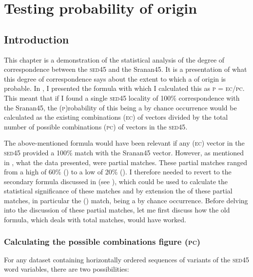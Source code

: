 \chapter{Testing probability of origin}\label{ch:4}

\section{Introduction} \label{4.1}
This chapter is a demonstration of the statistical analysis of the degree of correspondence between the \textsc{sed45} and the Sranan45. It is a presentation of what this degree of correspondence says about the extent to which a  of origin is probable. In , I presented the formula with which I calculated this  as \textsc{p} = \textsc{ec}\slash\textsc{pc}. This meant that if I found a single \textsc{sed45} locality of 100\% correspondence with the Sranan45, the (\textsc{p})robability of this being a by chance occurrence would be calculated as the existing combinations (\textsc{ec}) of vectors divided by the total number of possible combinations (\textsc{pc}) of vectors in the \textsc{sed45}.

The above-mentioned formula would have been relevant if any (\textsc{ec}) vector in the \textsc{sed45} provided a 100\% match with the Sranan45 vector. However, as mentioned in , what the data presented, were partial matches. These partial matches ranged from a high of 60\% () to a low of 20\% (). I therefore needed to revert to the secondary formula discussed in  (see ), which could be used to calculate the statistical significance of these matches and by extension the  of these partial matches, in particular the () match, being a by chance occurrence. Before delving into the discussion of these partial matches, let me first discuss how the old  formula, which deals with total matches, would have worked.

\subsection{Calculating the possible combinations figure (\textsc{pc})} \label{4.1.1}
For any dataset containing horizontally ordered sequences of variants of the \textsc{sed45} word variables, there are two possibilities:

